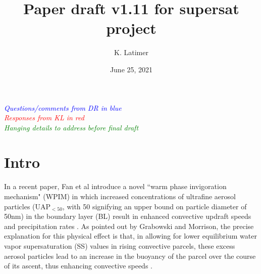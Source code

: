 \documentclass{article}
\title{Paper draft v1.11 for supersat project}
\author{K. Latimer}
\date{June 25, 2021}
\newcommand{\drcomm}[1]{\textcolor{blue}{\textit{#1}}}
\newcommand{\klcomm}[1]{\textcolor{red}{\textit{#1}}}
\newcommand{\todo}[1]{\textcolor{green}{\textit{#1}}}
\begin{document}
\maketitle

\noindent\drcomm{Questions/comments from DR in blue} \\
\noindent\klcomm{Responses from KL in red}\\
\noindent\todo{Hanging details to address before final draft}\\

\section{Intro}

In a recent paper, Fan et al introduce a novel ``warm phase invigoration mechanism" (WPIM) in which increased concentrations of ultrafine aerosol particles (UAP$_{<50}$, with 50 signifying an upper bound on particle diameter of 50nm) in the boundary layer (BL) result in enhanced convective updraft speeds and precipitation rates \cite{Fan2018}. As pointed out by Grabowski and Morrison, the precise explanation for this physical effect is that, in allowing for lower equilibrium water vapor supersaturation (SS) values in rising convective parcels, these excess aerosol particles lead to an increase in the buoyancy of the parcel over the course of its ascent, thus enhancing convective speeds \cite{Grabowski2020}.
\end{document}
